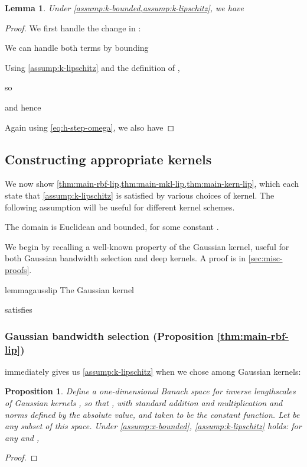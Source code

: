 \documentclass{article}
\newtheorem{lemma}[theorem]{Lemma} \crefname{lemma}{Lemma}{Lemmas}
\newtheorem{prop}[theorem]{Proposition}  \crefname{prop}{Proposition}{Propositions}
\begin{document}
\begin{lemma} \label{thm:sigma-hat-lip}
  Under \cref{assump:k-bounded,assump:k-lipschitz},
  we have
  
\end{lemma}
\begin{proof}
    We first handle the change in :
    
    We can handle both terms by bounding
    
    Using \cref{assump:k-lipschitz} and the definition of ,
    
    so
    
    and hence
    

Again using \eqref{eq:h-step-omega},
    we also have
    
\end{proof}


\subsection{Constructing appropriate kernels} \label{sec:proof:kernel-props}

We now show \cref{thm:main-rbf-lip,thm:main-mkl-lip,thm:main-kern-lip},
which each state that 
\cref{assump:k-lipschitz} is satisfied by various choices of kernel.
The following assumption will be useful for different kernel schemes.

\begin{netassumplist}
  \item \label{assump:x-bounded}
    The domain  is Euclidean and bounded,
     for some constant .
\end{netassumplist}

We begin by recalling a well-known property of the Gaussian kernel, useful for both Gaussian bandwidth selection and deep kernels.
A proof is in \cref{sec:misc-proofs}.
\begin{restatable}{lemma}{gausslip} \label{thm:gauss-lip}
    The Gaussian kernel
    
    satisfies
    
\end{restatable}

\subsubsection{Gaussian bandwidth selection (Proposition \ref{thm:main-rbf-lip})} \label{sec:proof:bw-sel}

 immediately gives us \cref{assump:k-lipschitz} when we chose among Gaussian kernels:
\begin{prop} \label{thm:rbf-lip}
    Define a one-dimensional Banach space for inverse lengthscales of Gaussian kernels ,
    so that ,
    with standard addition and multiplication
    and norms defined by the absolute value,
    and  taken to be the constant  function.
    Let  be any subset of this space.
    Under \cref{assump:x-bounded},
    \cref{assump:k-lipschitz} holds:
    for any  and ,
    
\end{prop}
\begin{proof}
    
\end{proof}
\end{document}
